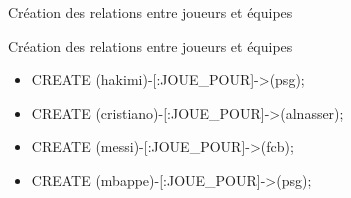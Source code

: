 \begin{frame}{Création des relations entre joueurs et équipes}
  \begin{block}{Création des relations entre joueurs et équipes}
    \begin{itemize}
      \item CREATE (hakimi)-[:JOUE\_POUR]->(psg);
      \item CREATE (cristiano)-[:JOUE\_POUR]->(alnasser);
      \item CREATE (messi)-[:JOUE\_POUR]->(fcb);
      \item CREATE (mbappe)-[:JOUE\_POUR]->(psg);
    \end{itemize}
  \end{block}
\end{frame}